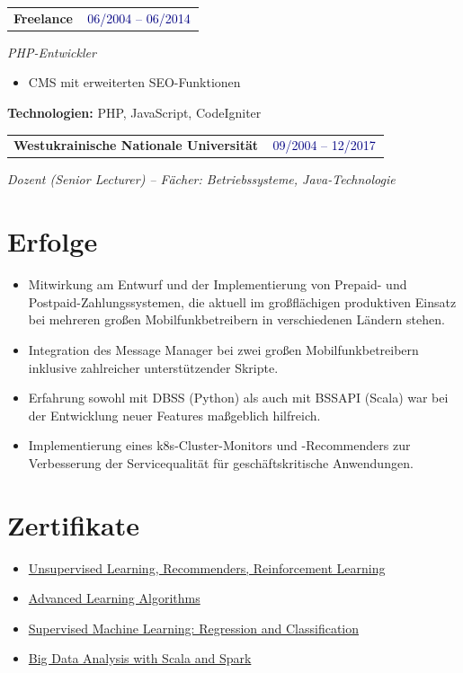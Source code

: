 \documentclass[10pt,a4paper]{article}
\makeatletter
\newcommand{\entryrow}[2]{%
  \noindent\begin{tabularx}{\linewidth}{@{}X@{\hspace{8pt}}r@{}}
  \textbf{#1} & \colorbox{navyfaint}{\footnotesize\textcolor{navy}{\,#2\,}}\\
  \end{tabularx}%
}
\newcommand{\role}[1]{{\itshape\footnotesize\color{gray1}#1}\par\vspace{0.5pt}}
\newcommand{\techline}[1]{%
  {\setlength{\fboxsep}{2.2pt}%
  \vspace{1pt}\noindent
  \colorbox{gray2}{\parbox{\dimexpr\linewidth-2\fboxsep\relax}{\footnotesize\color{gray1}\textbf{Technologien: }#1}}}
  \vspace{1.5pt}\par
}
\makeatother
\begin{document}
\entryrow{Freelance}{06/2004 -- 06/2014}
\role{PHP-Entwickler}
\begin{itemize}
  \item CMS mit erweiterten SEO-Funktionen
\end{itemize}
\techline{PHP, JavaScript, CodeIgniter}

\entryrow{Westukrainische Nationale Universität}{09/2004 -- 12/2017}
\role{Dozent (Senior Lecturer) -- Fächer: Betriebssysteme, Java-Technologie}

\section*{Erfolge}
\begin{itemize}
  \item Mitwirkung am Entwurf und der Implementierung von Prepaid- und Postpaid-Zahlungssystemen, die aktuell im großflächigen produktiven Einsatz bei mehreren großen Mobilfunkbetreibern in verschiedenen Ländern stehen.
  \item Integration des Message Manager bei zwei großen Mobilfunkbetreibern inklusive zahlreicher unterstützender Skripte.
  \item Erfahrung sowohl mit DBSS (Python) als auch mit BSSAPI (Scala) war bei der Entwicklung neuer Features maßgeblich hilfreich.
  \item Implementierung eines k8s-Cluster-Monitors und -Recommenders zur Verbesserung der Servicequalität für geschäftskritische Anwendungen.
\end{itemize}

\section*{Zertifikate}
\begin{itemize}
  \item \href{https://coursera.org/share/2ebc59f06b3331339859133d6571aafa}{Unsupervised Learning, Recommenders, Reinforcement Learning}
  \item \href{https://coursera.org/share/5bd5fb3081e2dc3503a12073b73c5bee}{Advanced Learning Algorithms}
  \item \href{https://coursera.org/share/1449f4013aaff33a5da5d8b459521d4d}{Supervised Machine Learning: Regression and Classification}
  \item \href{https://coursera.org/share/15d40eb8e6f00ecbb3d0141bada2779e}{Big Data Analysis with Scala and Spark}
\end{itemize}
\end{document}
